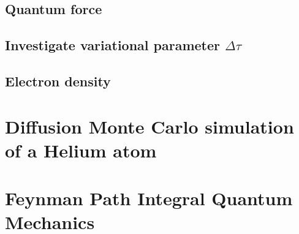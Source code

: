 \documentclass[
	a4paper, %
	10pt, %
]{CSUniSchoolLabReport}
\begin{document}
\subsection{Quantum force}

\subsection{Investigate variational parameter $\Delta\tau$}

\subsection{Electron density}

\section{Diffusion Monte Carlo simulation of a Helium atom}

\section{Feynman Path Integral Quantum Mechanics}





\newpage

\printbibliography %

\end{document}
